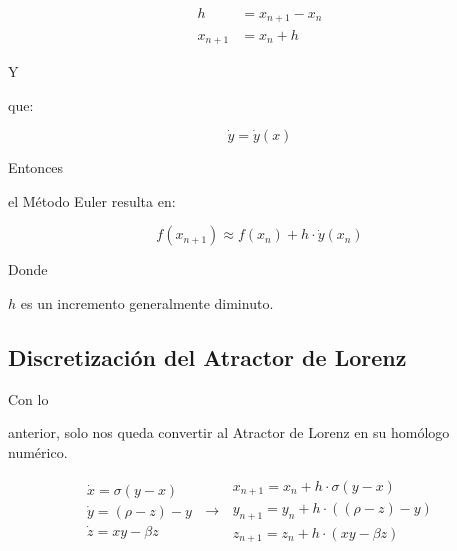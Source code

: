\documentclass[stu, 12pt, letterpaper, donotrepeattitle, floatsintext]{apa7}
\begin{document}
    \begin{equation*}
      \begin{aligned}
        h&=x_{n+1}-x_n\\
        x_{n+1}&=x_n+h
      \end{aligned}
    \end{equation*}\par
    Y \begin{justifying}
      que:\par  
    \end{justifying}
    \vspace*{-\abovedisplayskip}  
    \[\dot{y}=\dot{y}(x)\]\par
    Entonces \begin{justifying}
      el Método Euler resulta en:\par
    \end{justifying}
    \vspace*{-\abovedisplayskip}
    \[f(x_{n+1})\approx f(x_n)+h\cdot\dot{y}(x_n)\]\par
    Donde \begin{justifying}
      \(h\) es un incremento generalmente diminuto.\par
    \end{justifying}
    \vspace{\baselineskip}
    \subsection*{Discretización del Atractor de Lorenz}
    Con lo \begin{justifying}
      anterior, solo nos queda convertir al Atractor de Lorenz en su homólogo numérico.\par
    \end{justifying}
    \vspace*{-\abovedisplayskip}
    \begin{equation*}
      \begin{matrix}
        \dot{x}=\sigma (y-x)\\
        \dot{y}=(\rho-z)-y\\
        \dot{z}=xy-\beta z
      \end{matrix}\;\rightarrow\;
      \begin{matrix}
        x_{n+1}=x_n+h\cdot\sigma (y-x)\\
        y_{n+1}=y_n+h\cdot((\rho-z)-y)\\
        z_{n+1}=z_n+h\cdot(xy-\beta z)
      \end{matrix}
    \end{equation*}\par
\end{document}
